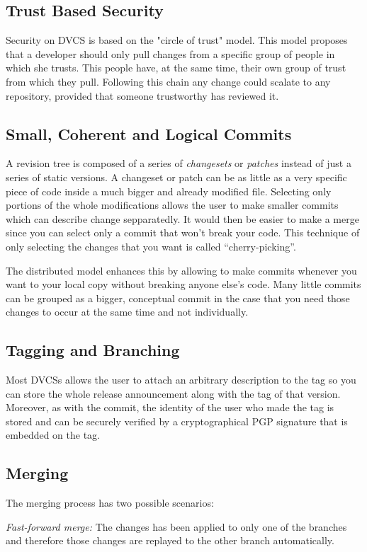\documentclass[a4paper,10pt]{article}
\begin{document}
\subsection{Trust Based Security}
Security on DVCS is based on the "circle of trust" model. This model proposes that a developer should only pull changes from a specific group of people
in which she trusts. This people have, at the same time, their own group of trust from which they pull. Following this chain any change could scalate
to any repository, provided that someone trustworthy has reviewed it.

\subsection{Small, Coherent and Logical Commits}
A revision tree is composed of a series of \emph{changesets} or \emph{patches} instead of just a series of static versions. A changeset or patch
can be as little as a very specific piece of code inside a much bigger and already modified file. Selecting only portions of the whole modifications
allows the user to make smaller commits which can describe change sepparatedly. It would then be easier to make a merge since you can select
only a commit that won't break your code. This technique of only selecting the changes that you want is called ``cherry-picking''.

The distributed model enhances this by allowing to make commits whenever you want to your local copy without breaking anyone else's code. Many little commits can be grouped as a bigger, conceptual commit in the case that you need those changes to occur at the same time and not individually. 

\subsection{Tagging and Branching}
Most DVCSs allows the user to attach an arbitrary description to the tag so you can store the whole release announcement along with the tag of that version. Moreover, as with the commit, the identity of the user who made the tag is stored and can be securely verified by a cryptographical PGP signature that is embedded on the tag.

\subsection{Merging}
The merging process has two possible scenarios:

\emph{Fast-forward merge:} The changes has been applied to only one of the branches and therefore those changes are replayed to the other branch automatically.
\end{document}
